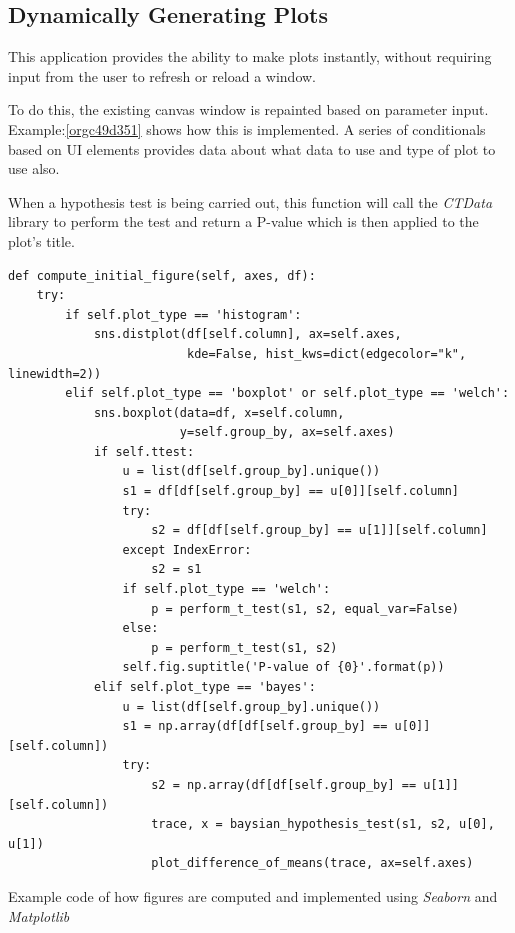 \documentclass[11pt]{report}
\begin{document}
\subsection{Dynamically Generating Plots}
\label{sec:org52aa0a3}
This application provides the ability to make plots instantly, without requiring input from the user to refresh or reload a window.

To do this, the existing canvas window is repainted based on parameter input. Example:\ref{orgc49d351}
shows how this is implemented. A series of conditionals based on UI elements provides data about what data to use and type of plot to use also.

When a hypothesis test is being carried out, this function will call the \emph{CTData} library to perform the test and return a P-value which is then applied to the plot's title.

\begin{listing}[htbp]
\begin{verbatim}
def compute_initial_figure(self, axes, df):
    try:
        if self.plot_type == 'histogram':
            sns.distplot(df[self.column], ax=self.axes,
                         kde=False, hist_kws=dict(edgecolor="k", linewidth=2))
        elif self.plot_type == 'boxplot' or self.plot_type == 'welch':
            sns.boxplot(data=df, x=self.column,
                        y=self.group_by, ax=self.axes)
            if self.ttest:
                u = list(df[self.group_by].unique())
                s1 = df[df[self.group_by] == u[0]][self.column]
                try:
                    s2 = df[df[self.group_by] == u[1]][self.column]
                except IndexError:
                    s2 = s1
                if self.plot_type == 'welch':
                    p = perform_t_test(s1, s2, equal_var=False)
                else:
                    p = perform_t_test(s1, s2)
                self.fig.suptitle('P-value of {0}'.format(p))
            elif self.plot_type == 'bayes':
                u = list(df[self.group_by].unique())
                s1 = np.array(df[df[self.group_by] == u[0]][self.column])
                try:
                    s2 = np.array(df[df[self.group_by] == u[1]][self.column])
                    trace, x = baysian_hypothesis_test(s1, s2, u[0], u[1])
                    plot_difference_of_means(trace, ax=self.axes)
\end{verbatim}
\caption{\label{orgc49d351}
Example code of how figures are computed and implemented using \emph{Seaborn} and \emph{Matplotlib}}
\end{listing}
\end{document}
